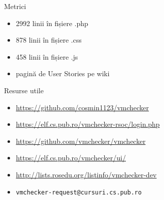\documentclass{simple}
\begin{document}
\begin{frame}{Metrici}
  \begin{itemize}
    \item 2992 linii în fișiere .php
    \item 878 linii în fișiere .css
    \item 458 linii în fișiere .js
    \item pagină de User Stories pe wiki
  \end{itemize}
\end{frame}

\begin{frame}{Resurse utile}
  \begin{itemize}
    \item \url{https://github.com/cosmin1123/vmchecker}
    \item \url{https://elf.cs.pub.ro/vmchecker-rsoc/login.php}
    \item \url{https://github.com/vmchecker/vmchecker}
    \item \url{https://elf.cs.pub.ro/vmchecker/ui/}
    \item \url{http://lists.rosedu.org/listinfo/vmchecker-dev}
    \item \texttt{vmchecker-request@cursuri.cs.pub.ro}
  \end{itemize}
\end{frame}
\end{document}
